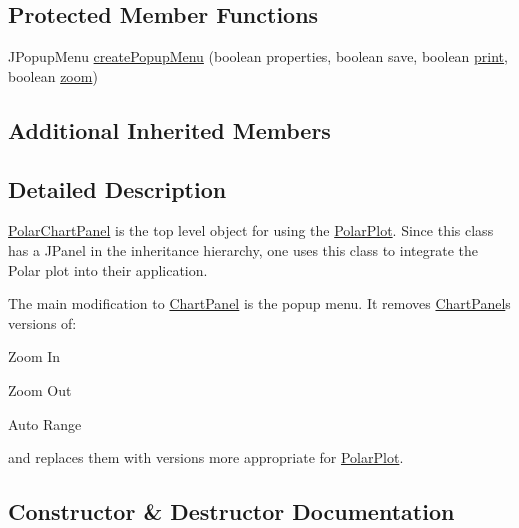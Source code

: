 \subsection*{Protected Member Functions}
\begin{DoxyCompactItemize}
\item 
J\+Popup\+Menu \mbox{\hyperlink{classorg_1_1jfree_1_1chart_1_1_polar_chart_panel_aa889afc958850d510d9ef56a911af6f2}{create\+Popup\+Menu}} (boolean properties, boolean save, boolean \mbox{\hyperlink{classorg_1_1jfree_1_1chart_1_1_chart_panel_a5d268d825853e74d978f93bd962c87a9}{print}}, boolean \mbox{\hyperlink{classorg_1_1jfree_1_1chart_1_1_chart_panel_a38d1f7fc6721aef92a30c0b79ecdaed9}{zoom}})
\end{DoxyCompactItemize}
\subsection*{Additional Inherited Members}


\subsection{Detailed Description}
{\ttfamily \mbox{\hyperlink{classorg_1_1jfree_1_1chart_1_1_polar_chart_panel}{Polar\+Chart\+Panel}}} is the top level object for using the \mbox{\hyperlink{}{Polar\+Plot}}. Since this class has a {\ttfamily J\+Panel} in the inheritance hierarchy, one uses this class to integrate the Polar plot into their application. 

The main modification to {\ttfamily \mbox{\hyperlink{classorg_1_1jfree_1_1chart_1_1_chart_panel}{Chart\+Panel}}} is the popup menu. It removes {\ttfamily \mbox{\hyperlink{classorg_1_1jfree_1_1chart_1_1_chart_panel}{Chart\+Panel}}}\textquotesingle{}s versions of\+: 
\begin{DoxyItemize}
\item {\ttfamily Zoom In} 
\item {\ttfamily Zoom Out} 
\item {\ttfamily Auto Range} 
\end{DoxyItemize}and replaces them with versions more appropriate for \mbox{\hyperlink{}{Polar\+Plot}}. 

\subsection{Constructor \& Destructor Documentation}
\mbox{\label{classorg_1_1jfree_1_1chart_1_1_polar_chart_panel_affe082b9529d4d4e808571a5686bc15d}} 
